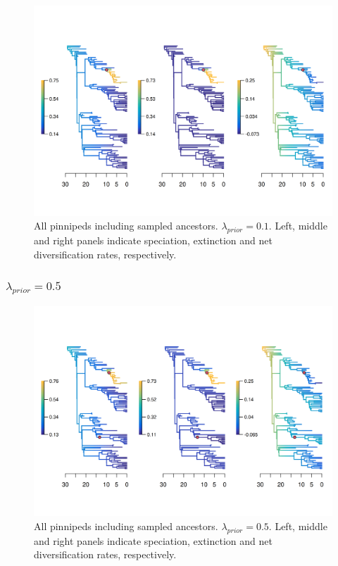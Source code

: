 \documentclass[a4paper, 12pt]{article}
\begin{document}
\begin{figure}[H]
  \centering
  \includegraphics[width = \linewidth]{figures/diversification/sensitivity-analyses-with-sampled-ancestors/shifts-0-1/sensitivity-analysis-with-sampled-ancestors-0-1.png}
  \caption{All pinnipeds including sampled ancestors. $\lambda_{prior} = 0.1$. Left, middle and right panels indicate speciation, extinction and net diversification rates, respectively.}
  \label{fig-full-0-1}
\end{figure}

\subsubsection{$\lambda_{prior} = 0.5$}

\begin{figure}[H]
  \centering
  \includegraphics[width = \linewidth]{figures/diversification/sensitivity-analyses-with-sampled-ancestors/shifts-0-5/sensitivity-analysis-with-sampled-ancestors-0-5.png}
  \caption{All pinnipeds including sampled ancestors. $\lambda_{prior} = 0.5$. Left, middle and right panels indicate speciation, extinction and net diversification rates, respectively.}
  \label{fig-full-0-5}
\end{figure}
\end{document}
